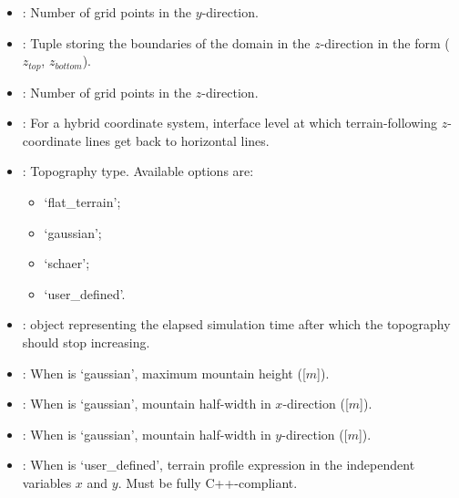 \documentclass[letterpaper,10pt,english]{sphinxmanual}
\begin{document}
\begin{description}
\begin{itemize}
\item {} 
: Number of grid points in the \(y\)-direction.

\item {} 
: Tuple storing the boundaries of the domain in the \(z\)-direction              in the form (\(z_{top}\), \(z_{bottom}\)).

\item {} 
: Number of grid points in the \(z\)-direction.

\item {} 
: For a hybrid coordinate system, interface level at which terrain-following              \(z\)-coordinate lines get back to horizontal lines.

\item {} 
: Topography type. Available options are:
\begin{itemize}
\item {} 
‘flat\_terrain’;

\item {} 
‘gaussian’;

\item {} 
‘schaer’;

\item {} 
‘user\_defined’.

\end{itemize}

\item {} 
:  object representing the elapsed simulation time                               after which the topography should stop increasing.

\item {} 
: When  is ‘gaussian’, maximum mountain height ({[}\(m\){]}).

\item {} 
: When  is ‘gaussian’, mountain half-width in \(x\)-direction             ({[}\(m\){]}).

\item {} 
: When  is ‘gaussian’, mountain half-width in \(y\)-direction             ({[}\(m\){]}).

\item {} 
: When  is ‘user\_defined’, terrain profile expression in the independent          variables \(x\) and \(y\). Must be fully C++-compliant.


\end{itemize}
\end{description}
\end{document}
